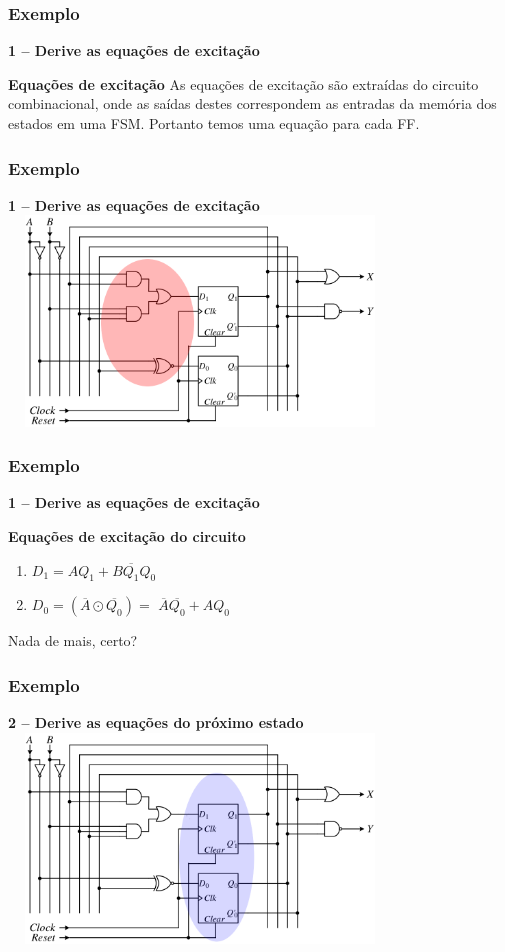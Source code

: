 \documentclass{beamer}
\begin{document}
\begin{frame}
  \frametitle{Exemplo}
  \textbf{1 – Derive as equações de excitação}
  \begin{block}{\textbf{Equações de excitação}}
  As equações de excitação são extraídas do circuito combinacional, onde as 
  saídas destes correspondem as entradas da memória dos estados em uma FSM.
  Portanto temos uma equação para cada FF.
  \end{block}
\end{frame}

\begin{frame}
  \frametitle{Exemplo}
  \textbf{1 – Derive as equações de excitação}
  \includegraphics[height = 2.2in, width = 4in]{images/EXEMPLO_ANALISE_2.png}
\end{frame}

\begin{frame}
  \frametitle{Exemplo}
  \textbf{1 – Derive as equações de excitação}
  \begin{block}{\textbf{Equações de excitação do circuito}}
    \begin{enumerate}
     \item $ D_1 = AQ_1 + B\overline{Q_1}Q_0 $
     \item $ D_0 = (\overline{A}\odot\overline{Q_0}) = $
        $\overline{A}\overline{Q_0} + AQ_0 $
    \end{enumerate}
  \end{block}
  \pause
  Nada de mais, certo?
\end{frame}

\begin{frame}
  \frametitle{Exemplo}
  \textbf{2 – Derive as equações do próximo estado}
  \includegraphics[height = 2.2in, width = 4in]{images/EXEMPLO_ANALISE_3.png}
\end{frame}
\end{document}

